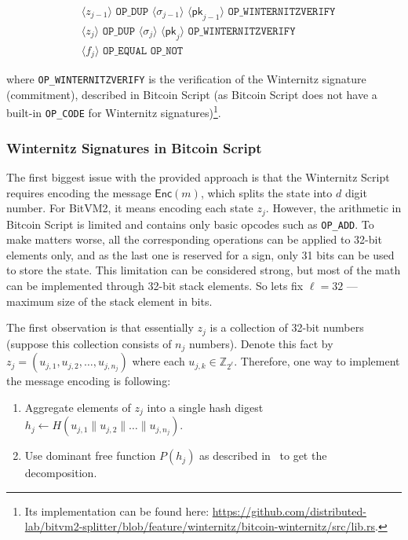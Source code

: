 \documentclass{iacrtrans}
\newcommand{\elem}[1]{\, \langle #1 \rangle \,}
\newcommand{\opcode}[1]{\, \texttt{#1} \,}
\begin{document}
\begin{empheqboxed}
  \begin{align*}
    &\elem{z_{j-1}} \opcode{OP\_DUP} \elem{\sigma_{j-1}}
    \elem{\mathsf{pk}_{j-1}} \opcode{OP\_WINTERNITZVERIFY} \\
    &\elem{z_{j}} \opcode{OP\_DUP} \elem{\sigma_{j}}
    \elem{\mathsf{pk}_{j}} \opcode{OP\_WINTERNITZVERIFY} \\
    &\elem{f_j} \opcode{OP\_EQUAL} \opcode{OP\_NOT}
  \end{align*}
\end{empheqboxed}

where \texttt{OP\_WINTERNITZVERIFY} is the verification of the Winternitz
signature (commitment), described in Bitcoin Script (as Bitcoin Script does not
have a built-in \texttt{OP\_CODE} for Winternitz signatures)\footnote{Its
implementation can be found here:
\url{https://github.com/distributed-lab/bitvm2-splitter/blob/feature/winternitz/bitcoin-winternitz/src/lib.rs}.}.

\subsubsection{Winternitz Signatures in Bitcoin
  Script}\label{sec:winternitz-in-bitcoin-script}

The first biggest issue with the provided approach is that the Winternitz Script
requires encoding the message $\mathsf{Enc}(m)$, which splits the state into $d$
digit number. For BitVM2, it means encoding each state $z_j$. However, the
arithmetic in Bitcoin Script is limited and contains only basic opcodes such as
\texttt{OP\_ADD}. To make matters worse, all the corresponding operations can be
applied to 32-bit elements only, and as the last one is reserved for a sign,
only 31 bits can be used to store the state. This limitation can be considered
strong, but most of the math can be implemented through 32-bit stack elements.
So lets fix $\ell = 32$ --- maximum size of the stack element in bits.

The first observation is that essentially $z_j$ is a collection of 32-bit numbers (suppose this collection consists of $n_j$ numbers). Denote this fact by $z_j = (u_{j,1}, u_{j,2}, \dots, u_{j, n_j})$ where each $u_{j,k} \in \mathbb{Z}_{2^{\ell}}$. Therefore, one way to implement the message encoding is following:
\begin{enumerate}
  \item Aggregate elements of $z_j$ into a single hash digest $h_j \gets
  H(u_{j,1} \parallel u_{j,2} \parallel \dots \parallel u_{j,n_j})$.
  \item Use dominant free function $P(h_j)$ as described in~\cite{applied-crypto} to get the decomposition.
\end{enumerate}
\end{document}
